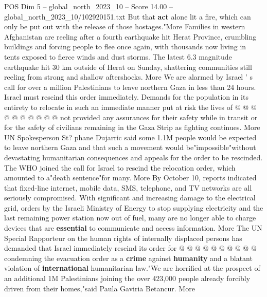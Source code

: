 \begin{textsample}{POS Dim 5 – global\_north\_2023\_10 – Score 14.00 – global\_north\_2023\_10/102920151.txt}
But that \textbf{act} alone lit a fire, which can only be put out with the release of those hostages."More Families in western Afghanistan are reeling after a fourth earthquake hit Herat Province, crumbling buildings and forcing people to flee once again, with thousands now living in tents exposed to fierce winds and dust storms.
The latest 6.3 magnitude earthquake hit 30 km outside of Herat on Sunday, shattering communities still reeling from strong and shallow aftershocks.
More We are alarmed by Israel ' s call for over a million Palestinians to leave northern Gaza in less than 24 hours.
Israel must rescind this order immediately.
Demands for the population in its entirety to relocate in such an immediate manner put at risk the lives of @ @ @ @ @ @ @ @ @ @ not provided any assurances for their safety while in transit or for the safety of civilians remaining in the Gaza Strip as fighting continues.
More UN Spokesperson St? phane Dujarric said some 1.1M people would be expected to leave northern Gaza and that such a movement would be"impossible"without devastating humanitarian consequences and appeals for the order to be rescinded.
The WHO joined the call for Israel to rescind the relocation order, which amounted to a"death sentence"for many.
More By October 10, reports indicated that fixed-line internet, mobile data, SMS, telephone, and TV networks are all seriously compromised.
With significant and increasing damage to the electrical grid, orders by the Israeli Ministry of Energy to stop supplying electricity and the last remaining power station now out of fuel, many are no longer able to charge devices that are \textbf{essential} to communicate and access information.
More The UN Special Rapporteur on the human rights of internally displaced persons has demanded that Israel immediately rescind its order for @ @ @ @ @ @ @ @ @ @ condemning the evacuation order as a \textbf{crime} against \textbf{humanity} and a blatant violation of \textbf{international} humanitarian law."We are horrified at the prospect of an additional 1M Palestinians joining the over 423,000 people already forcibly driven from their homes,"said Paula Gaviria Betancur.
More

\end{textsample}
